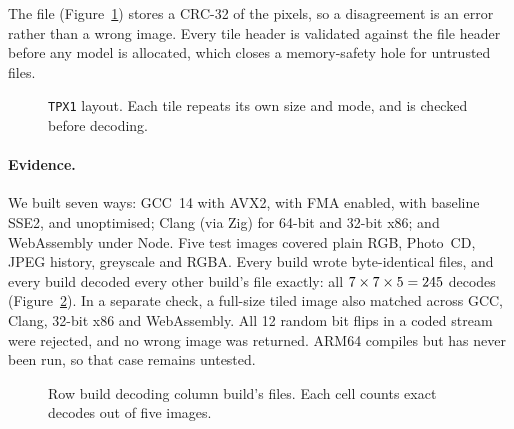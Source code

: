 \documentclass[10pt,twocolumn]{article}
\begin{document}
The file (Figure~\ref{fig:format}) stores a CRC-32 of the pixels, so a disagreement is an error rather than a wrong image. Every tile header is validated against the file header before any model is allocated, which closes a memory-safety hole for untrusted files.

\begin{figure}[t]
\centering
{}
\caption{\texttt{TPX1} layout. Each tile repeats its own size and mode, and is checked before decoding.}
\label{fig:format}
\end{figure}

\paragraph{Evidence.}
We built seven ways: GCC~14 with AVX2, with FMA enabled, with baseline SSE2, and unoptimised; Clang (via Zig) for 64-bit and 32-bit x86; and WebAssembly under Node. Five test images covered plain RGB, Photo~CD, JPEG history, greyscale and RGBA. Every build wrote byte-identical files, and every build decoded every other build's file exactly: all $7\times7\times5=245$ decodes (Figure~\ref{fig:matrix}). In a separate check, a full-size tiled image also matched across GCC, Clang, 32-bit x86 and WebAssembly. All 12 random bit flips in a coded stream were rejected, and no wrong image was returned. ARM64 compiles but has never been run, so that case remains untested.

\begin{figure}[t]
\centering
{}
\caption{Row build decoding column build's files. Each cell counts exact decodes out of five images.}
\label{fig:matrix}
\end{figure}
\end{document}
